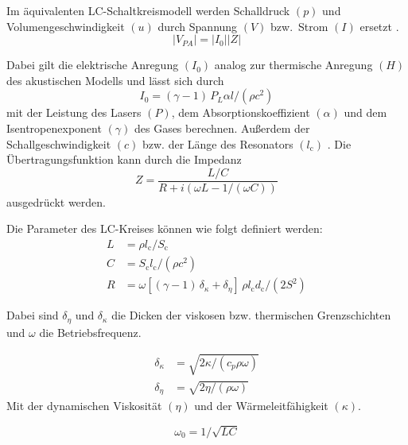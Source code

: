 Im äquivalenten LC-Schaltkreismodell werden Schalldruck $(p)$ und Volumengeschwindigkeit $(u)$ durch Spannung $(V)$ bzw.\ Strom $(I)$ ersetzt \cite{tavakoli_2010}. 
\begin{equation}
    |V_{PA}| = |I_0| |Z|
\end{equation}

Dabei gilt die elektrische Anregung $(I_0)$ analog zur thermische Anregung $(H)$ des akustischen Modells und lässt sich durch
\begin{equation}
    I_0 = (\gamma - 1)\, P_L \alpha l / (\rho c^2)
\end{equation}
mit der Leistung des Lasers $(P)$, dem Absorptionskoeffizient $(\alpha)$ und dem Isentropenexponent $(\gamma)$ des Gases berechnen.
Außerdem der Schallgeschwindigkeit $(c)$ bzw. der Länge des Resonators $(l_\mathrm{c})$ .
Die Übertragungsfunktion kann durch die Impedanz
\begin{equation}
    Z = \frac{L / C}{R + i (\omega L - 1 /(\omega C))}
\end{equation}
ausgedrückt werden.

Die Parameter des LC-Kreises können wie folgt definiert werden:
\begin{subequations}
    \begin{align}
        L &= \rho l_\mathrm{c} / S_\mathrm{c} \\
        C &= S_\mathrm{c} l_\mathrm{c} / (\rho c^2) \\
        R &= \omega [(\gamma - 1)\, \delta _\kappa + \delta _\eta]\, \rho l_\mathrm{c} d_\mathrm{c} / (2 S^2)
    \end{align}
\end{subequations}

Dabei sind $\delta _\eta$ und $\delta _\kappa$ die Dicken der viskosen bzw. thermischen Grenzschichten und $\omega$ die Betriebsfrequenz. \cite{bijnen_1996,morse_1968}

\begin{subequations}
    \begin{align}
        \delta _\kappa &= \sqrt{2 \kappa / (c_p \rho \omega)} \\
        \delta _\eta &= \sqrt{2 \eta / (\rho \omega)}
    \end{align}
\end{subequations}
Mit der dynamischen Viskosität $(\eta)$ und der Wärmeleitfähigkeit $(\kappa)$.

\begin{equation}
    \omega _0 = 1 / \sqrt{LC}
\end{equation}

